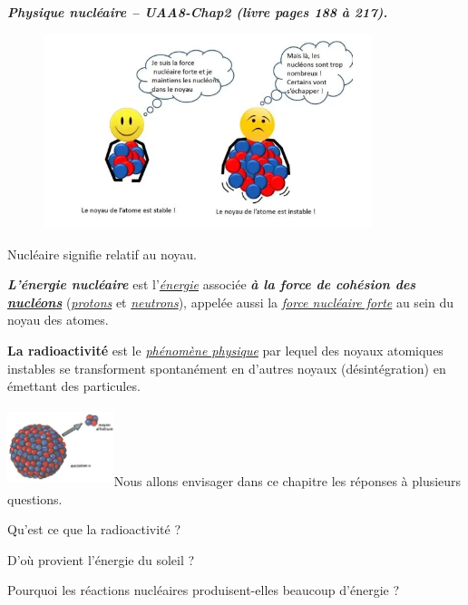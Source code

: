 \emph{\textbf{Physique nucléaire -- UAA8-Chap2 (livre pages 188 à
217).}}

\begin{figure}
\centering
\includegraphics[width=9.597cm,height=5.674cm]{Pictures/10000001000002340000014E5A1981B62E922D6D.png}
\caption{}
\end{figure}

Nucléaire signifie relatif au noyau.

\emph{\textbf{L'énergie nucléaire}} est
l'\href{https://fr.wikipedia.org/wiki/\%C3\%89nergie_(physique)}{\emph{\emph{énergie}}}
associée \emph{\textbf{à la force de cohésion des
}}\href{https://fr.wikipedia.org/wiki/Nucl\%C3\%A9on}{\emph{\emph{\textbf{nucléons}}}}
(\href{https://fr.wikipedia.org/wiki/Proton}{\emph{\emph{protons}}} et
\href{https://fr.wikipedia.org/wiki/Neutron}{\emph{\emph{neutrons}}}),
appelée aussi la
\href{https://fr.wikipedia.org/wiki/Interaction_forte}{\emph{\emph{force
nucléaire forte}}} au sein du noyau des atomes.

\textbf{La radioactivité} est le
\href{https://fr.wikipedia.org/wiki/Ph\%C3\%A9nom\%C3\%A8ne_physique}{\emph{\emph{phénomène
physique}}} par lequel des noyaux atomiques instables se transforment
spontanément en d'autres noyaux (désintégration) en émettant des
particules.

\includegraphics[width=3.117cm,height=2.281cm]{Pictures/10000000000001E00000013EE6B5ED22BED582FE.jpg}Nous
allons envisager dans ce chapitre les réponses à plusieurs questions.

Qu'est ce que la radioactivité ?

D'où provient l'énergie du soleil ?

Pourquoi les réactions nucléaires produisent-elles beaucoup d'énergie ?

